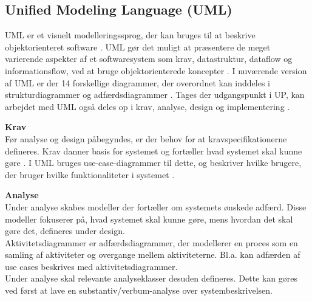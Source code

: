 
\subsection{Unified Modeling Language (UML)}\label{UML}
UML er et visuelt modelleringssprog, der kan bruges til at beskrive objektorienteret software \citep{Arlow2002}. UML gør det muligt at præsentere de meget varierende aspekter af et softwaresystem som krav, datastruktur, dataflow og informationsflow, ved at bruge objektorienterede koncepter \citep{Seidl2012}. I nuværende version af UML er der 14 forskellige diagrammer, der overordnet kan inddeles i strukturdiagrammer og adfærdsdiagrammer \citep{Seidl2012}. Tages der udgangspunkt i UP, kan arbejdet med UML også deles op i krav, analyse, design og implementering \citep{Arlow2002}. 

\textbf{Krav}\\
Før analyse og design påbegyndes, er der behov for at kravspecifikationerne defineres. Krav danner basis for systemet og fortæller hvad systemet skal kunne gøre \citep{Arlow2002}. I UML bruges use-case-diagrammer til dette, og beskriver hvilke brugere, der bruger hvilke funktionaliteter i systemet \citep{Seidl2012}.


\textbf{Analyse}\\
Under analyse skabes modeller der fortæller om systemets ønskede adfærd. Disse modeller fokuserer på, hvad systemet skal kunne gøre, mens hvordan det skal gøre det, defineres under design. \citep{Arlow2002}\\
Aktivitetsdiagrammer er adfærdsdiagrammer, der modellerer en proces som en samling af aktiviteter og overgange mellem aktiviteterne. Bl.a. kan adfærden af use cases beskrives med aktivitetsdiagrammer. \citep{Arlow2002}\\
Under analyse skal relevante analyseklasser desuden defineres. Dette kan gøres ved først at lave en substantiv/verbum-analyse over systembeskrivelsen. \citep{Arlow2002}

